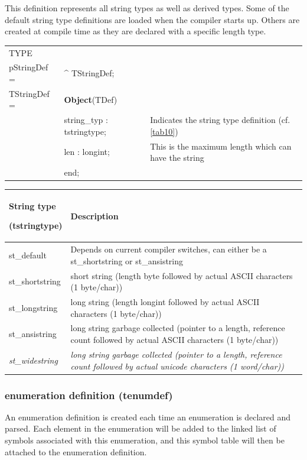 \documentclass [12pt]{article}
\begin{document}
This definition represents all string types as well as derived types. Some 
of the default string type definitions are loaded when the compiler starts 
up. Others are created at compile time as they are declared with a specific 
length type.

\begin{tabular*}{6.5in}{|l@{\extracolsep{\fill}}lp{9cm}|}
\hline
\textsf{TYPE}& & \\
\xspace pStringDef = & \^{}  TStringDef; & \\
\xspace \textsf{TStringDef} = & \textbf{Object}(TDef) & \\
&\textsf{string{\_}typ : tstringtype;}& 
	Indicates the string type definition (cf. \ref{tab10}) \\
&\textsf{len : longint;}& 
	This is the maximum length which can have the string \\
&\textsf{end;}& \\
\hline
\end{tabular*}

\begin{longtable}{|l|p{10cm}|}
\hline
String type \par (tstringtype) & Description \\
\hline
\endhead
\hline
\endfoot
\textsf{st{\_}default}& 
	Depends on current compiler switches, can either be a
	st{\_}shortstring or st{\_}ansistring \\
\textsf{st{\_}shortstring}& 
	short string (length byte followed by actual ASCII characters (1
	byte/char)) \\
\textsf{st{\_}longstring}& 
	long string (length longint followed by actual ASCII characters (1
	byte/char)) \\
\textsf{st{\_}ansistring}& 
	long string garbage collected (pointer to a length, reference count
	followed by actual ASCII characters (1 byte/char)) \\
\textsf{\textit{st{\_}widestring}}& 
	\textit{long string garbage collected (pointer to a length,
	reference count followed by actual unicode characters (1
	word/char))} \\
\end{longtable}

\subsubsection{enumeration definition (tenumdef)}
\label{subsubsec:mylabel9}

An enumeration definition is created each time an enumeration is declared 
and parsed. Each element in the enumeration will be added to the linked list 
of symbols associated with this enumeration, and this symbol table will then 
be attached to the enumeration definition.
\end{document}
